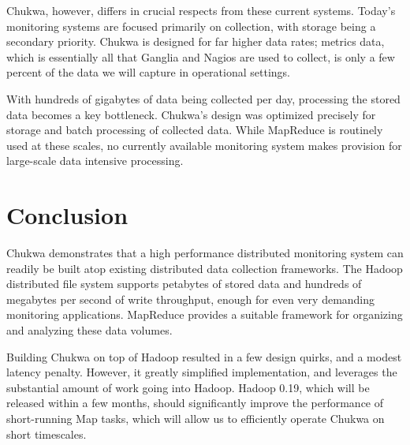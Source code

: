 \documentclass[letterpaper,twocolumn,10pt]{article}
\begin{document}
Chukwa, however, differs in crucial respects from these current systems. Today's monitoring systems are focused primarily on collection, with storage being a secondary priority.  Chukwa is designed for far higher data rates; metrics data, which is essentially all that Ganglia and Nagios are used to collect, is only a few percent of the data we will capture in operational settings. 

With hundreds of gigabytes of data being collected per day, processing the stored data becomes a key bottleneck.  Chukwa's design was optimized precisely for storage and batch processing of collected data.  While MapReduce is routinely used at these scales, no currently available monitoring system makes provision for large-scale data intensive processing. 


\section{Conclusion}

Chukwa demonstrates that a high performance distributed monitoring system can readily be built atop existing distributed data collection frameworks. The Hadoop distributed file system supports petabytes of stored data and hundreds of megabytes per second of write throughput, enough for even very demanding monitoring applications. MapReduce provides a suitable framework for organizing and analyzing these data volumes.


Building Chukwa on top of Hadoop resulted in a few design quirks, and a modest latency penalty.  However, it greatly simplified implementation, and leverages the substantial amount of work going into Hadoop.  Hadoop 0.19, which will be released within a few months, should significantly improve the performance of short-running Map tasks, which will allow us to efficiently operate Chukwa on short timescales.


\end{document}
